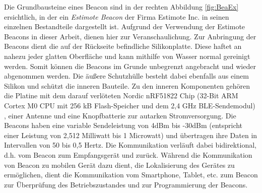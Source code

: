 Die Grundbausteine eines Beacon sind in der rechten Abbildung \ref{fig:BeaEx} ersichtlich, in der ein \textit{Estimote Beacon} der Firma Estimote Inc. in seinen einzelnen Bestandteile dargestellt ist. Aufgrund der Verwendung der Estimote Beacons in dieser Arbeit, dienen hier zur Veranschaulichung. Zur Anbringung der Beacons dient die auf der Rückseite befindliche Silikonplatte. Diese haftet an nahezu jeder glatten Oberfläche und kann mithilfe von Wasser normal gereinigt werden. Somit können die Beacons im Grunde unbegrenzt angebracht und wieder abgenommen werden. Die äußere Schutzhülle besteht dabei ebenfalls aus einem Silikon und schützt die inneren Bauteile. Zu den inneren Komponenten gehören die Platine mit dem darauf verlöteten Nordic nRF51822 Chip (32-Bit ARM Cortex M0 CPU mit 256 kB Flash-Speicher und dem 2,4 GHz BLE-Sendemodul) \cite{nRF5}, einer Antenne und eine Knopfbatterie zur autarken Stromversorgung. Die Beacons haben eine variable Sendeleistung von 4dBm bis -30dBm (entspricht einer Leistung von 2,512 Milliwatt bis 1 Microwatt) und übertragen ihre Daten in Intervallen von 50 bis 0,5 Hertz. Die Kommunikation verläuft dabei bidirektional, d.h. vom Beacon zum Empfangsgerät und zurück. Während die Kommunikation von Beacon zu mobilen Gerät dazu dient, die Lokalisierung des Gerätes zu ermöglichen, dient die Kommunikation vom Smartphone, Tablet, etc. zum Beacon zur Überprüfung des Betriebszustandes und zur Programmierung der Beacons. \\ \\

